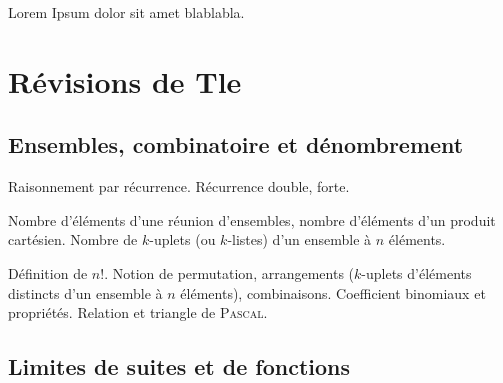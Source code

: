 \documentclass[a4paper,french,bookmarks]{book}
\begin{document}
    Lorem Ipsum dolor sit amet blablabla.
    
    \pagestyle{intro}
    
    
    \newpage
    \tableofcontents\thispagestyle{toc}
    
    
    
    \pagestyle{plain}
    
    \setcounter{chapter}{-1}
    
    \def\khdate{intégration des SUP}
    \chapter{Révisions de Tle}
    
    \section*{Ensembles, combinatoire et dénombrement}
    
    \begin{enumerate}
        \ithand Raisonnement par récurrence. Récurrence double, forte.
        
        \ithand Nombre d'éléments d'une réunion d'ensembles, nombre d'éléments d'un produit cartésien. Nombre de $k$-uplets (ou $k$-listes) d'un ensemble à $n$ éléments.
        
        \ithand Définition de $n!$. Notion de permutation, arrangements ($k$-uplets d'éléments distincts d'un ensemble à $n$ éléments), combinaisons. Coefficient binomiaux et propriétés. Relation et triangle de \textsc{Pascal}.
    \end{enumerate}
    
    \section*{Limites de suites et de fonctions}
    
\end{document}
